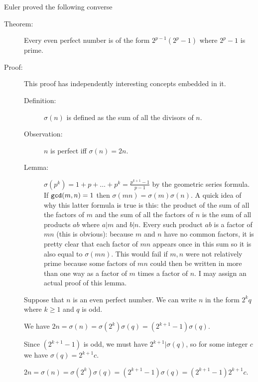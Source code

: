 \documentclass[12pt]{article}
\begin{document}
Euler proved the following converse

\begin{description}

\item[Theorem:]   Every even perfect number is of the form $2^{p-1}(2^p-1)$ where $2^p-1$ is prime.

\item[Proof:]

This proof has independently interesting concepts embedded in it.

\begin{description}

\item[Definition:]  $\sigma(n)$ is defined as the sum of all the divisors of $n$.

\item[Observation:]  $n$ is perfect iff $\sigma(n)=2n$.

\item[Lemma:]  $\sigma(p^k)= 1+p+\ldots+p^k = \frac{p^{k+1}-1}{p-1}$ by the geometric series formula.  If ${\tt gcd}(m,n)=1$ then $\sigma(mn)=\sigma(m)\sigma(n)$.   A quick idea of why this latter formula is
true is this:  the product of the sum of all the factors of $m$ and the sum of all the factors of $n$ is the sum of  all products $ab$ where $a|m$ and $b|n$.  Every such product $ab$ is a factor of $mn$ (this is obvious):
because $m$ and $n$ have no common factors, it is pretty clear that each factor of $mn$ appears once in this sum so it is also equal to $\sigma(mn)$.  This would fail if $m, n$ were not relatively prime because some factors of $mn$ could then be written in more than one way as a factor of $m$ times a factor of $n$.   I may assign an actual proof of this lemma.


\end{description}

Suppose that $n$ is an even perfect number.   We can write $n$ in the form $2^kq$ where $k \geq 1$ and $q$ is odd.

We have $2n = \sigma(n)= \sigma(2^k)\sigma(q)= (2^{k+1}-1)\sigma(q)$.

Since $(2^{k+1}-1)$ is odd, we must have $2^{k+1}|\sigma(q)$, so for some integer $c$ we have $\sigma(q)=2^{k+1}c$.


 $2n = \sigma(n)= \sigma(2^k)\sigma(q)= (2^{k+1}-1)\sigma(q) =  (2^{k+1}-1)2^{k+1}c$.


\end{description}
\end{document}
